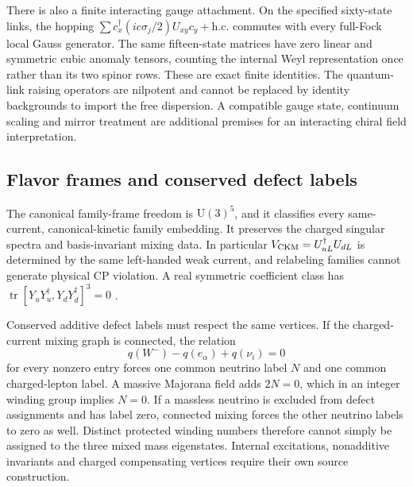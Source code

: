 \documentclass[11pt]{article}
\newcommand{\U}{\mathrm{U}}
\begin{document}
There is also a finite interacting gauge attachment. On the specified
sixty-state links, the hopping
$\sum c_x^\dagger(i c\sigma_j/2)U_{xy}c_y+\mathrm{h.c.}$ commutes with
every full-Fock local Gauss generator. The same fifteen-state matrices have
zero linear and symmetric cubic anomaly tensors, counting the internal
Weyl representation once rather than its two spinor rows. These are exact
finite identities. The quantum-link raising operators are nilpotent and
cannot be replaced by identity backgrounds to import the free dispersion.
A compatible gauge state, continuum scaling and mirror treatment are
additional premises for an interacting chiral field interpretation.

\subsection{Flavor frames and conserved defect labels}
\label{sec:flavor-labels}

The canonical family-frame freedom is $\U(3)^5$, and it classifies every
same-current, canonical-kinetic family embedding. It preserves the charged
singular spectra and basis-invariant mixing data. In particular
$V_{\rm CKM}=U_{uL}^\dagger U_{dL}$ is determined by the same left-handed
weak current, and relabeling families cannot generate physical CP violation.
A real symmetric coefficient class has
$\operatorname{tr}[Y_uY_u^\dagger,Y_dY_d^\dagger]^3=0$
\cite{pwjarlskog1985commutator}.

Conserved additive defect labels must respect the same vertices. If the
charged-current mixing graph is connected, the relation
\[
 q(W^-)-q(e_\alpha)+q(\nu_i)=0
\]
for every nonzero entry forces one common neutrino label $N$ and one common
charged-lepton label. A massive Majorana field adds $2N=0$, which in an integer
winding group implies $N=0$. If a massless neutrino is excluded from defect
assignments and has label zero, connected mixing forces the other neutrino labels
to zero as well. Distinct protected winding numbers therefore cannot simply be
assigned to the three mixed mass eigenstates. Internal excitations, nonadditive
invariants and charged compensating vertices require their own source
construction.
\end{document}
